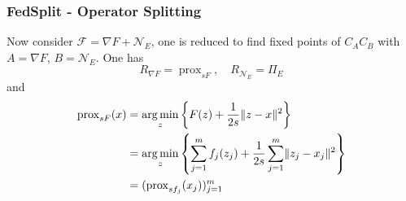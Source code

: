 
\begin{frame}
\frametitle{FedSplit - Operator Splitting}

Now consider $\mathcal{F} = \nabla F + \mathcal{N}_E$, one is reduced to find fixed points of $C_AC_B$ with $A = \nabla F$, $B = \mathcal{N}_E$. One has
$$R_{\nabla F} = \operatorname{prox}_{sF}, \quad R_{\mathcal{N}_E} = \Pi_{E}$$
and
\begin{align*}
\operatorname{prox}_{sF}(x) & = \operatorname*{arg\,min}_z \left\{ F(z) + \frac{1}{2s} \lVert z-x \rVert^2 \right\} \\
& = \operatorname*{arg\,min}_z \left\{ \sum_{j=1}^m f_j(z_j) + \frac{1}{2s} \sum_{j=1}^m \lVert z_j-x_j \rVert^2 \right\} \\
& = (\operatorname{prox}_{sf_j}(x_j))_{j=1}^m
\end{align*}

\end{frame}


